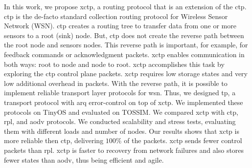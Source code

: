 In this work, we propose \ac{xctp}, a routing protocol that is an extension of the \ac{ctp}. \ac{ctp} is the de-facto standard collection routing protocol for Wireless Sensor Network (WSN). \ac{ctp} creates a routing tree to transfer data from one or more sensors to a root (sink) node. But, \ac{ctp} does not create the reverse path between the root node and sensors nodes. This reverse path is important, for example, for feedback commands or acknowledgment packets. \ac{xctp} enables communication in both ways: root to node and node to root. \ac{xctp} accomplishes this task by exploring the \ac{ctp} control plane packets. \ac{xctp} requires low storage states and very low additional overhead in packets.  With the reverse path, it is possible to implement reliable transport layer protocols for \ac{wsn}. Thus, we designed \ac{tp}, a transport protocol with \ac{arq} error-control on top of \ac{xctp}. We implemented these protocols on TinyOS and evaluated on TOSSIM. We compared \ac{xctp} with \ac{ctp}, \ac{rpl}, and \ac{aodv} protocols. We conducted scalability and stress tests, evaluating them with different loads and number of nodes. Our results shows that \ac{xctp} is more reliable then \ac{ctp}, delivering $100\%$ of the packets. \ac{xctp} sends fewer control packets than \ac{rpl}. \ac{xctp} is faster to recovery from network failures and also stores fewer states than \ac{aodv}, thus being efficient and agile.